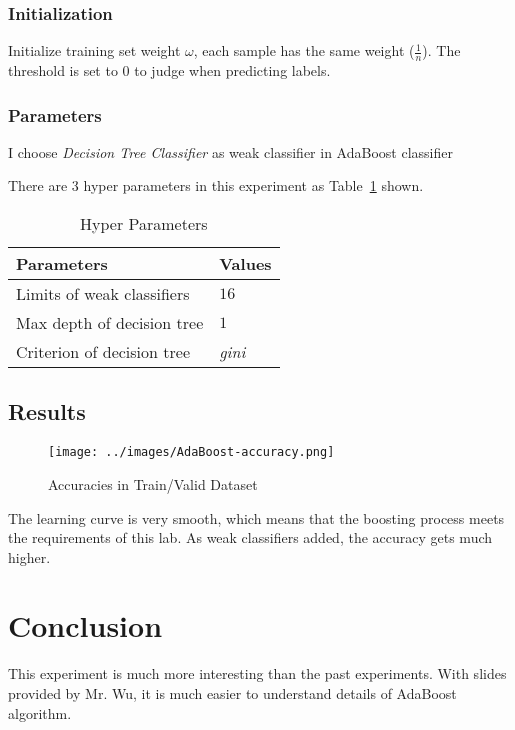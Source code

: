 \documentclass[journal, a4paper]{IEEEtran}
\begin{document}
\subsubsection{Initialization}
    Initialize training set weight $\omega$, each sample has the same weight ($\frac{1}{n}$). The threshold is set to 0 to judge when predicting labels.

\subsubsection{Parameters}
    I choose \textit{Decision Tree Classifier} as weak classifier in AdaBoost classifier

    There are 3 hyper parameters in this experiment as Table~\ref{tab:hyper-params} shown.
    \begin{table}[!hbt]
        \begin{center}
            \caption{Hyper Parameters}
            \label{tab:hyper-params}
            \begin{tabular}{l|l}
                \hline
                Parameters & Values \\
                \hline
                Limits of weak classifiers & $16$ \\
                Max depth of decision tree & $1$ \\
                Criterion of decision tree & \textit{gini} \\
                \hline
            \end{tabular}
        \end{center}
    \end{table}

\subsection{Results}

    \begin{figure}[!hbt]
        \begin{center}
        \caption{Accuracies in Train/Valid Dataset}
        \label{fig:acc}
        \texttt{[image: ../images/AdaBoost-accuracy.png]}
        \end{center}
    \end{figure}
  
    The learning curve is very smooth, which means that the boosting process meets the requirements of this lab. As weak classifiers added, the accuracy gets much higher.

\section{Conclusion}
	This experiment is much more interesting than the past experiments. With slides provided by Mr. Wu, it is much easier to understand details of AdaBoost algorithm. 

\end{document}
